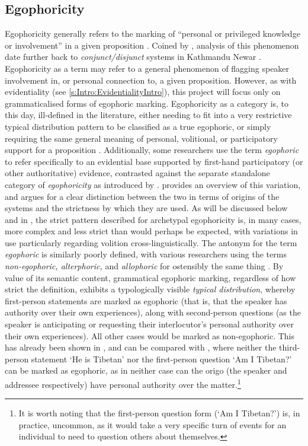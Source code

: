 \subsection{Egophoricity}\label{s:Intro:EgophoricityIntro}
Egophoricity generally refers to the marking of ``personal or privileged knowledge or involvement'' in a given proposition \cite[2]{EgoIntro}. Coined by , analysis of this phenomenon date further back to \textit{conjunct/disjunct} systems in Kathmandu Newar \cite[Newaric: Nepal, ][]{HaleNewar1980}. Egophoricity as a term may refer to a general phenomenon of flagging speaker involvement in, or personal connection to, a given proposition. However, as with evidentiality (see \ref{s:Intro:EvidentialityIntro}), this project will focus only on grammaticalised forms of egophoric marking. Egophoricity as a category is, to this day, ill-defined in the literature, either needing to fit into a very restrictive typical distribution pattern to be classified as a true egophoric, or simply requiring the same general meaning of personal, volitional, or participatory support for a proposition \cites{EgoIntro}{Gawne2017}. Additionally, some researchers use the term \textit{egophoric} to refer specifically to an evidential base supported by first-hand participatory (or other authoritative) evidence, contrasted against the separate standalone category of \textit{egophoricity} as introduced by .  provides an overview of this variation, and argues for a clear distinction between the two in terms of origins of the systems and the strictness by which they are used. As will be discussed below and in , the strict pattern described for archetypal egophoricity is, in many cases, more complex and less strict than would perhaps be expected, with variations in use particularly regarding volition cross-linguistically. The antonym for the term \textit{egophoric} is similarly poorly defined, with various researchers using the terms \textit{non-egophoric, alterphoric,} and \textit{allophoric} for ostensibly the same thing \cite{Widmer2020}. By value of its semantic content, grammatical egophoric marking, regardless of how strict the definition, exhibits a typologically visible \textit{typical distribution}, whereby first-person statements are marked as egophoric (that is, that the speaker has authority over their own experiences), along with second-person questions (as the speaker is anticipating or requesting their interlocutor's personal authority over their own experiences). All other cases would be marked as non-egophoric. This has already been shown in , and can be compared with , where neither the third-person statement `He is Tibetan' nor the first-person question `Am I Tibetan?' can be marked as egophoric, as in neither case can the origo (the speaker and addressee respectively) have personal authority over the matter.\footnote{It is worth noting that the first-person question form (`Am I Tibetan?') is, in practice, uncommon, as it would take a very specific turn of events for an individual to need to question others about themselves.}

